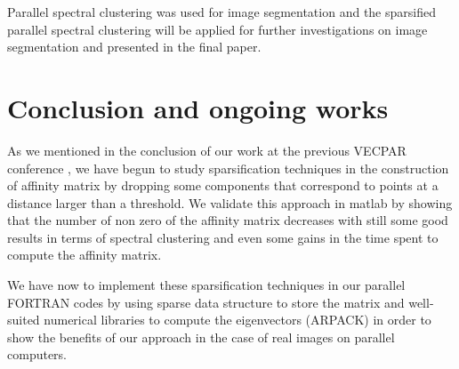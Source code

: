 \documentclass{llncs}
\begin{document}
Parallel spectral clustering was used for image segmentation \cite{mouysset3}
and the sparsified parallel spectral clustering will be applied for further
investigations on image segmentation and presented in the final paper.

\section{Conclusion and ongoing works}

As we mentioned in the conclusion of our work at the previous VECPAR
conference \cite{mouysset3}, we have begun to study sparsification techniques in the
construction of affinity matrix by dropping some components that correspond to
points at a distance larger than a threshold.
We validate this approach in matlab by showing that the number of non zero of the
affinity matrix decreases with still some good results in terms of spectral
clustering and even some gains in the time spent to compute the affinity
matrix.


We have now to implement these sparsification techniques in our parallel
FORTRAN codes
by using sparse data structure to store the matrix and well-suited numerical
libraries to compute the eigenvectors (ARPACK) in order to show the benefits
of our approach in the case of real images on parallel computers. 
\end{document}

